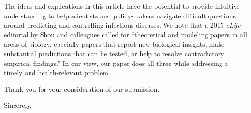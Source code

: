 \documentclass[12pt]{letter}
\begin{document}
\begin{letter}{
}
The ideas and explications in this article have the potential to provide intuitive understanding to help scientists and policy-makers navigate difficult questions around predicting and controlling infectious diseases.
We note that a 2015 \emph{eLife} editorial by Shou and colleagues \cite{shou2015theory} called for ``theoretical and modeling papers in all areas of biology, epecially papers that report new biological insights, make substantial predictions that can be tested, or help to resolve contradictory empirical findings.''
In our view, our paper does all three while addressing a timely and health-relevant problem.

Thank you for your consideration of our submission.

\closing{Sincerely,}



\end{letter}
\end{document}
